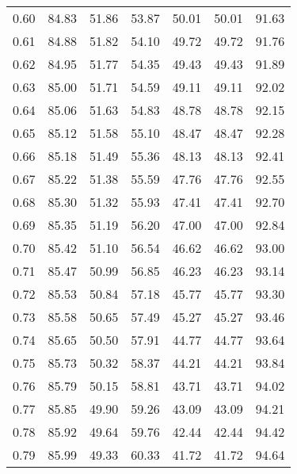 \begin{tabular}{|c|c|c|c|c|c|c|}
      0.60 &     84.83 &     51.86 &      53.87 &   50.01 &      50.01 &         91.63 \\
      0.61 &     84.88 &     51.82 &      54.10 &   49.72 &      49.72 &         91.76 \\
      0.62 &     84.95 &     51.77 &      54.35 &   49.43 &      49.43 &         91.89 \\
      0.63 &     85.00 &     51.71 &      54.59 &   49.11 &      49.11 &         92.02 \\
      0.64 &     85.06 &     51.63 &      54.83 &   48.78 &      48.78 &         92.15 \\
      0.65 &     85.12 &     51.58 &      55.10 &   48.47 &      48.47 &         92.28 \\
      0.66 &     85.18 &     51.49 &      55.36 &   48.13 &      48.13 &         92.41 \\
      0.67 &     85.22 &     51.38 &      55.59 &   47.76 &      47.76 &         92.55 \\
      0.68 &     85.30 &     51.32 &      55.93 &   47.41 &      47.41 &         92.70 \\
      0.69 &     85.35 &     51.19 &      56.20 &   47.00 &      47.00 &         92.84 \\
      0.70 &     85.42 &     51.10 &      56.54 &   46.62 &      46.62 &         93.00 \\
      0.71 &     85.47 &     50.99 &      56.85 &   46.23 &      46.23 &         93.14 \\
      0.72 &     85.53 &     50.84 &      57.18 &   45.77 &      45.77 &         93.30 \\
      0.73 &     85.58 &     50.65 &      57.49 &   45.27 &      45.27 &         93.46 \\
      0.74 &     85.65 &     50.50 &      57.91 &   44.77 &      44.77 &         93.64 \\
      0.75 &     85.73 &     50.32 &      58.37 &   44.21 &      44.21 &         93.84 \\
      0.76 &     85.79 &     50.15 &      58.81 &   43.71 &      43.71 &         94.02 \\
      0.77 &     85.85 &     49.90 &      59.26 &   43.09 &      43.09 &         94.21 \\
      0.78 &     85.92 &     49.64 &      59.76 &   42.44 &      42.44 &         94.42 \\
      0.79 &     85.99 &     49.33 &      60.33 &   41.72 &      41.72 &         94.64 \\

\end{tabular}
